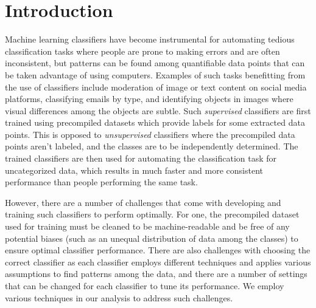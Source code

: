 \documentclass[journal,twocolumn,12pt,twoside]{IEEEtran}
\begin{document}
\section{Introduction}
Machine learning classifiers have become instrumental for automating tedious classification tasks where people are prone to making errors and are often inconsistent, but patterns can be found among quantifiable data points that can be taken advantage of using computers. Examples of such tasks benefitting from the use of classifiers include moderation of image or text content on social media platforms, classifying emails by type, and identifying objects in images where visual differences among the objects are subtle. Such \textit{supervised} classifiers are first trained using precompiled datasets which provide labels for some extracted data points. This is opposed to \textit{unsupervised} classifiers where the precompiled data points aren't labeled, and the classes are to be independently determined. The trained classifiers are then used for automating the classification task for uncategorized data, which results in much faster and more consistent performance than people performing the same task.
\par However, there are a number of challenges that come with developing and training such classifiers to perform optimally. For one, the precompiled dataset used for training must be cleaned to be machine-readable and be free of any potential biases (such as an unequal distribution of data among the classes) to ensure optimal classifier performance. There are also challenges with choosing the correct classifier as each classifier employs different techniques and applies various assumptions to find patterns among the data, and there are a number of settings that can be changed for each classifier to tune its performance. We employ various techniques in our analysis to address such challenges.
\end{document}
